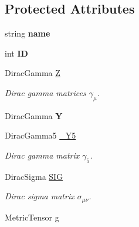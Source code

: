 \subsection*{Protected Attributes}
\begin{DoxyCompactItemize}
\item 
\hypertarget{class_c___abs_diagram_a919d23735a009dc5a78e02e01e1eb40b}{string {\bfseries name}}\label{class_c___abs_diagram_a919d23735a009dc5a78e02e01e1eb40b}

\item 
\hypertarget{class_c___abs_diagram_a08de955405ee0344287b2eb5f6cb62b5}{int {\bfseries I\-D}}\label{class_c___abs_diagram_a08de955405ee0344287b2eb5f6cb62b5}

\item 
\hypertarget{class_c___abs_diagram_a958ffee1be22aa70a0e2eb9fa44f5784}{Dirac\-Gamma \hyperlink{class_c___abs_diagram_a958ffee1be22aa70a0e2eb9fa44f5784}{Z}}\label{class_c___abs_diagram_a958ffee1be22aa70a0e2eb9fa44f5784}

\begin{DoxyCompactList}\small\item\em Dirac gamma matrices $ \gamma_\mu $. \end{DoxyCompactList}\item 
\hypertarget{class_c___abs_diagram_a4eded4aff0f19920d9ec52e2f5c63abf}{Dirac\-Gamma {\bfseries Y}}\label{class_c___abs_diagram_a4eded4aff0f19920d9ec52e2f5c63abf}

\item 
\hypertarget{class_c___abs_diagram_a31794dd2c315f6bf18e2908d669ccc61}{Dirac\-Gamma5 \hyperlink{class_c___abs_diagram_a31794dd2c315f6bf18e2908d669ccc61}{\-\_\-\-Y5}}\label{class_c___abs_diagram_a31794dd2c315f6bf18e2908d669ccc61}

\begin{DoxyCompactList}\small\item\em Dirac gamma matrix $ \gamma_5 $. \end{DoxyCompactList}\item 
\hypertarget{class_c___abs_diagram_ac4646ab596ff13dd531f28f755d3dd4e}{Dirac\-Sigma \hyperlink{class_c___abs_diagram_ac4646ab596ff13dd531f28f755d3dd4e}{S\-I\-G}}\label{class_c___abs_diagram_ac4646ab596ff13dd531f28f755d3dd4e}

\begin{DoxyCompactList}\small\item\em Dirac sigma matrix $ \sigma_{\mu\nu} $. \end{DoxyCompactList}\item 
\hypertarget{class_c___abs_diagram_a4daaf1d6cbcb0aa0bc93417eb11b49a4}{Metric\-Tensor \hyperlink{class_c___abs_diagram_a4daaf1d6cbcb0aa0bc93417eb11b49a4}{g}}\label{class_c___abs_diagram_a4daaf1d6cbcb0aa0bc93417eb11b49a4}


\end{DoxyCompactItemize}
